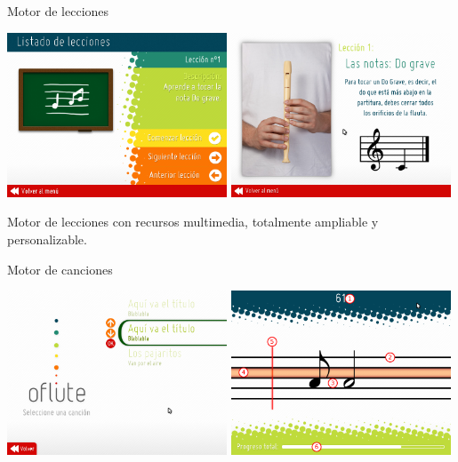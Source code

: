 {\begin{frame}{Motor de lecciones}
  \begin{center}
    \includegraphics[width=0.49\textwidth]{imagenes/imagen_seccionLecciones1}\hspace{0.1cm}
    \includegraphics[width=0.49\textwidth]{imagenes/imagen_seccionLecciones2}

    \medskip

    Motor de lecciones con recursos multimedia, totalmente ampliable y personalizable.
  \end{center}

\end{frame}

\begin{frame}{Motor de canciones}

  \begin{center}
    \includegraphics[width=0.49\textwidth]{imagenes/imagen_seccionCanciones1}\hspace{0.1cm}
    \includegraphics[width=0.49\textwidth]{imagenes/imagen_seccionCanciones2}


\end{center}
\end{frame}}
